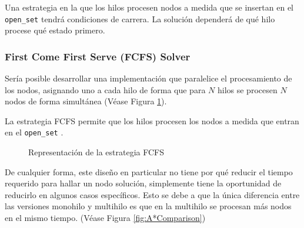\begin{examplebox}
    Una estrategia en la que los hilos procesen nodos
    a medida que se insertan en el \lstinline{open_set}
    tendrá condiciones de carrera.
    La solución dependerá de qué hilo procese qué estado
    primero.
\end{examplebox}


\subsubsection{First Come First Serve (FCFS) Solver}
\label{ssec:FCFS}

Sería posible desarrollar una implementación que paralelice el procesamiento de los nodos,
asignando uno a cada hilo de forma que para $N$ hilos se procesen $N$ nodos
de forma simultánea (Véase Figura \ref{fig:RepresentacionFCFS}).
\begin{keynotebox}
La estrategia FCFS permite que los hilos procesen los nodos a medida que entran en 
el \lstinline{open_set} .
\end{keynotebox}

\begin{figure}[h]
    \begin{center}
    \end{center}
    \caption{Representación de la estrategia FCFS}
    \label{fig:RepresentacionFCFS}
\end{figure}

De cualquier forma, este diseño en particular no tiene por qué reducir el tiempo
requerido para hallar un nodo solución, simplemente tiene la oportunidad de reducirlo
en algunos casos específicos.
Esto se debe a que la única diferencia entre las versiones monohilo y multihilo
es que en la multihilo se procesan más nodos en el mismo tiempo.
(Véase Figura \ref{fig:A*Comparison})


